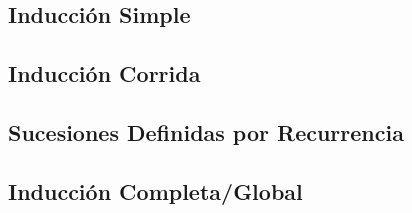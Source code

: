 \documentclass[10pt,a4paper]{article}
\begin{document}
\subsection*{Inducción Simple}
\label{subsec:induccion_simple}
\subsection*{Inducción Corrida}
\label{subsec:induccion_corrida}
\subsection*{Sucesiones Definidas por Recurrencia}
\label{subsec:sucesiones_recurrencia}
\subsection*{Inducción Completa/Global}
\label{subsec:induccion_completa}
\end{document}
